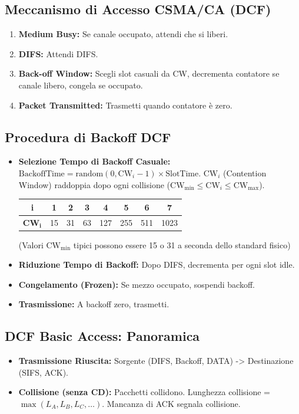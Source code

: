 \subsection{Meccanismo di Accesso CSMA/CA (DCF)}
\begin{enumerate}
    \item \textbf{Medium Busy:} Se canale occupato, attendi che si liberi.
    \item \textbf{DIFS:} Attendi DIFS.
    \item \textbf{Back-off Window:} Scegli slot casuali da CW, decrementa contatore se canale libero, congela se occupato.
    \item \textbf{Packet Transmitted:} Trasmetti quando contatore è zero.
\end{enumerate}

\subsection{Procedura di Backoff DCF}
\begin{itemize}
    \item \textbf{Selezione Tempo di Backoff Casuale:} $\text{BackoffTime} = \text{random}(0, \text{CW}_i - 1) \times \text{SlotTime}$.
    $\text{CW}_i$ (Contention Window) raddoppia dopo ogni collisione ($\text{CW}_{\min} \le \text{CW}_i \le \text{CW}_{\max}$).
    \begin{center}
    \begin{tabular}{|c|c|c|c|c|c|c|c|}
        \hline
        \textbf{i} & 1 & 2 & 3 & 4 & 5 & 6 & 7 \\ \hline
        $\mathbf{CW_i}$ & 15 & 31 & 63 & 127 & 255 & 511 & 1023 \\ \hline
    \end{tabular}
    \end{center}
    (Valori $\text{CW}_{\min}$ tipici possono essere 15 o 31 a seconda dello standard fisico)
    \item \textbf{Riduzione Tempo di Backoff:} Dopo DIFS, decrementa per ogni slot idle.
    \item \textbf{Congelamento (Frozen):} Se mezzo occupato, sospendi backoff.
    \item \textbf{Trasmissione:} A backoff zero, trasmetti.
\end{itemize}

\subsection{DCF Basic Access: Panoramica}
\begin{itemize}
    \item \textbf{Trasmissione Riuscita:} Sorgente (DIFS, Backoff, DATA) -> Destinazione (SIFS, ACK).
    \item \textbf{Collisione (senza CD):} Pacchetti collidono. Lunghezza collisione = $\max(L_A, L_B, L_C, \dots)$. Mancanza di ACK segnala collisione.
\end{itemize}

